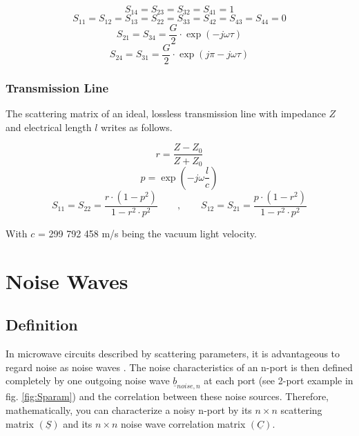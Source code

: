 \documentclass[10pt]{report}
\begin{document}
\begin{equation}
S_{14} = S_{23} = S_{32} = S_{41} = 1
\end{equation}
\begin{equation}
S_{11} = S_{12} = S_{13} = S_{22} = S_{33} = S_{42} = S_{43} = S_{44} = 0
\end{equation}
\begin{equation}
S_{21} = S_{34} = \frac{G}{2}\cdot \exp(-j\omega\tau)
\end{equation}
\begin{equation}
S_{24} = S_{31} = \frac{G}{2}\cdot \exp(j\pi-j\omega\tau)
\end{equation}

\subsection{Transmission Line}

The scattering matrix of an ideal, lossless transmission line with
impedance $Z$ and electrical length $l$ writes as follows.

\begin{equation}
r = \frac{Z-Z_0}{Z+Z_0}
\end{equation}
\begin{equation}
p = \exp(-j\omega\frac{l}{c})
\end{equation}
\begin{equation}
S_{11} = S_{22} = \frac{r\cdot(1-p^2)}{1-r^2\cdot p^2} \qquad,\qquad
S_{12} = S_{21} = \frac{p\cdot(1-r^2)}{1-r^2\cdot p^2}
\end{equation}

With $c$ = 299 792 458 m/s being the vacuum light velocity.


\chapter{Noise Waves}

\section{Definition}

In microwave circuits described by scattering parameters, it is
advantageous to regard noise as noise waves \cite{Wedge}.  The noise
characteristics of an n-port is then defined completely by one
outgoing noise wave $\underline{b}_{noise,n}$ at each port (see 2-port
example in fig. \ref{fig:Sparam}) and the correlation between these
noise sources.  Therefore, mathematically, you can characterize a
noisy n-port by its $n\times n$ scattering matrix $(\underline{S})$
and its $n\times n$ noise wave correlation matrix $(\underline{C})$.
\end{document}
